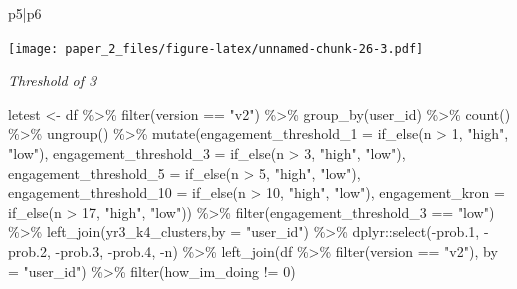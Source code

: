 \documentclass[
]{article}
\newenvironment{Shaded}{\begin{snugshade}}{\end{snugshade}}
\newcommand{\AttributeTok}[1]{\textcolor[rgb]{0.77,0.63,0.00}{#1}}
\newcommand{\DecValTok}[1]{\textcolor[rgb]{0.00,0.00,0.81}{#1}}
\newcommand{\FloatTok}[1]{\textcolor[rgb]{0.00,0.00,0.81}{#1}}
\newcommand{\FunctionTok}[1]{\textcolor[rgb]{0.00,0.00,0.00}{#1}}
\newcommand{\NormalTok}[1]{#1}
\newcommand{\OtherTok}[1]{\textcolor[rgb]{0.56,0.35,0.01}{#1}}
\newcommand{\SpecialCharTok}[1]{\textcolor[rgb]{0.00,0.00,0.00}{#1}}
\newcommand{\StringTok}[1]{\textcolor[rgb]{0.31,0.60,0.02}{#1}}
\begin{document}
\begin{Shaded}
\begin{Highlighting}[]
\NormalTok{p5}\SpecialCharTok{|}\NormalTok{p6}
\end{Highlighting}
\end{Shaded}

\texttt{[image: paper\_2\_files/figure-latex/unnamed-chunk-26-3.pdf]}

\emph{Threshold of 3}

\begin{Shaded}
\begin{Highlighting}[]
\NormalTok{letest }\OtherTok{\textless{}{-}}\NormalTok{  df }\SpecialCharTok{\%\textgreater{}\%}
  \FunctionTok{filter}\NormalTok{(version }\SpecialCharTok{==} \StringTok{"v2"}\NormalTok{) }\SpecialCharTok{\%\textgreater{}\%}
  \FunctionTok{group\_by}\NormalTok{(user\_id) }\SpecialCharTok{\%\textgreater{}\%}
  \FunctionTok{count}\NormalTok{() }\SpecialCharTok{\%\textgreater{}\%}
  \FunctionTok{ungroup}\NormalTok{() }\SpecialCharTok{\%\textgreater{}\%} 
  \FunctionTok{mutate}\NormalTok{(}\AttributeTok{engagement\_threshold\_1 =} \FunctionTok{if\_else}\NormalTok{(n }\SpecialCharTok{\textgreater{}} \DecValTok{1}\NormalTok{, }\StringTok{"high"}\NormalTok{, }\StringTok{"low"}\NormalTok{),}
         \AttributeTok{engagement\_threshold\_3 =} \FunctionTok{if\_else}\NormalTok{(n }\SpecialCharTok{\textgreater{}} \DecValTok{3}\NormalTok{, }\StringTok{"high"}\NormalTok{, }\StringTok{"low"}\NormalTok{),}
         \AttributeTok{engagement\_threshold\_5 =} \FunctionTok{if\_else}\NormalTok{(n }\SpecialCharTok{\textgreater{}} \DecValTok{5}\NormalTok{, }\StringTok{"high"}\NormalTok{, }\StringTok{"low"}\NormalTok{),}
         \AttributeTok{engagement\_threshold\_10 =} \FunctionTok{if\_else}\NormalTok{(n }\SpecialCharTok{\textgreater{}} \DecValTok{10}\NormalTok{, }\StringTok{"high"}\NormalTok{, }\StringTok{"low"}\NormalTok{),}
         \AttributeTok{engagement\_kron =} \FunctionTok{if\_else}\NormalTok{(n }\SpecialCharTok{\textgreater{}} \DecValTok{17}\NormalTok{, }\StringTok{"high"}\NormalTok{, }\StringTok{"low"}\NormalTok{)) }\SpecialCharTok{\%\textgreater{}\%} 
  \FunctionTok{filter}\NormalTok{(engagement\_threshold\_3 }\SpecialCharTok{==} \StringTok{"low"}\NormalTok{) }\SpecialCharTok{\%\textgreater{}\%} 
  \FunctionTok{left\_join}\NormalTok{(yr3\_k4\_clusters,}\AttributeTok{by =} \StringTok{"user\_id"}\NormalTok{) }\SpecialCharTok{\%\textgreater{}\%} 
\NormalTok{  dplyr}\SpecialCharTok{::}\FunctionTok{select}\NormalTok{(}\SpecialCharTok{{-}}\NormalTok{prob}\FloatTok{.1}\NormalTok{,}
          \SpecialCharTok{{-}}\NormalTok{prob}\FloatTok{.2}\NormalTok{,}
          \SpecialCharTok{{-}}\NormalTok{prob}\FloatTok{.3}\NormalTok{,}
          \SpecialCharTok{{-}}\NormalTok{prob}\FloatTok{.4}\NormalTok{,}
          \SpecialCharTok{{-}}\NormalTok{n) }\SpecialCharTok{\%\textgreater{}\%} 
  \FunctionTok{left\_join}\NormalTok{(df }\SpecialCharTok{\%\textgreater{}\%} 
  \FunctionTok{filter}\NormalTok{(version }\SpecialCharTok{==} \StringTok{"v2"}\NormalTok{),}
         \AttributeTok{by =} \StringTok{"user\_id"}\NormalTok{) }\SpecialCharTok{\%\textgreater{}\%}
  \FunctionTok{filter}\NormalTok{(how\_im\_doing }\SpecialCharTok{!=} \DecValTok{0}\NormalTok{)}



\end{Highlighting}
\end{Shaded}
\end{document}
